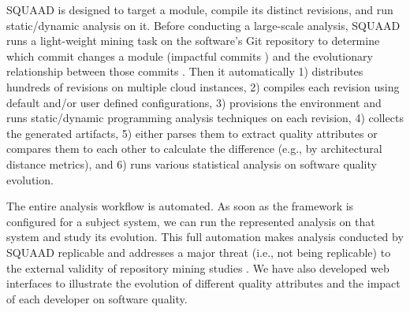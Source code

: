 
SQUAAD is designed to target a module, compile its distinct revisions, and run static/dynamic analysis on it.
Before conducting a large-scale analysis, SQUAAD runs a light-weight mining task on the software's Git repository to determine which commit changes a module (impactful commits \cite{Behnamghader2017qrs}) and the evolutionary relationship between those commits \cite{Behnamghader2018esem}.
Then it automatically
1) distributes hundreds of revisions on multiple cloud instances,
2) compiles each revision using default and/or user defined configurations,
3) provisions the environment and runs static/dynamic programming analysis techniques on each revision,
4) collects the generated artifacts,
5) either parses them to extract quality attributes or compares them to each other to calculate the difference (e.g., by architectural distance metrics), and
6) runs various statistical analysis on software quality evolution.

The entire analysis workflow is automated. As soon as the framework is configured for a subject system, we can run the represented analysis on that system and study its evolution.
This full automation makes analysis conducted by SQUAAD replicable and addresses a major threat (i.e., not being replicable) to the external validity of repository mining studies \cite{Trautsch:2016:APE:2901739.2901753}.
We have also developed web interfaces to illustrate the evolution of different quality attributes and the impact of each developer on software quality.

